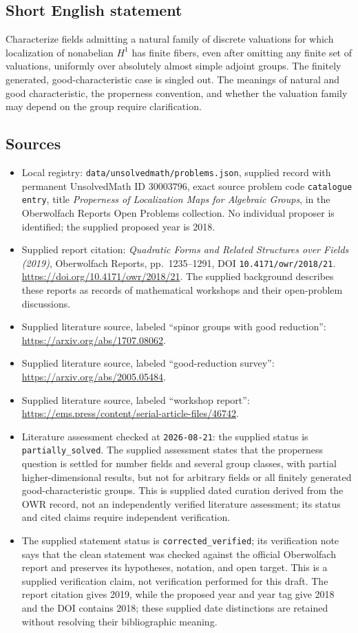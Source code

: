 \documentclass[11pt]{article}
\begin{document}
\subsection{Short English statement}
Characterize fields admitting a natural family of discrete valuations for which localization of nonabelian \(H^1\) has finite fibers, even after omitting any finite set of valuations, uniformly over absolutely almost simple adjoint groups. The finitely generated, good-characteristic case is singled out. The meanings of natural and good characteristic, the properness convention, and whether the valuation family may depend on the group require clarification.
\subsection{Sources}
\begin{itemize}
\item Local registry: \texttt{data/unsolvedmath/problems.json}, supplied record with permanent UnsolvedMath ID \(30003796\), exact source problem code \texttt{catalogue entry}, title \emph{Properness of Localization Maps for Algebraic Groups}, in the Oberwolfach Reports Open Problems collection. No individual proposer is identified; the supplied proposed year is 2018.
\item Supplied report citation: \emph{Quadratic Forms and Related Structures over Fields (2019)}, Oberwolfach Reports, pp.~1235--1291, DOI \texttt{10.4171/owr/2018/21}. \url{https://doi.org/10.4171/owr/2018/21}. The supplied background describes these reports as records of mathematical workshops and their open-problem discussions.
\item Supplied literature source, labeled ``spinor groups with good reduction'': \url{https://arxiv.org/abs/1707.08062}.
\item Supplied literature source, labeled ``good-reduction survey'': \url{https://arxiv.org/abs/2005.05484}.
\item Supplied literature source, labeled ``workshop report'': \url{https://ems.press/content/serial-article-files/46742}.
\item Literature assessment checked at \texttt{2026-08-21}: the supplied status is \texttt{partially\_solved}. The supplied assessment states that the properness question is settled for number fields and several group classes, with partial higher-dimensional results, but not for arbitrary fields or all finitely generated good-characteristic groups. This is supplied dated curation derived from the OWR record, not an independently verified literature assessment; its status and cited claims require independent verification.
\item The supplied statement status is \texttt{corrected\_verified}; its verification note says that the clean statement was checked against the official Oberwolfach report and preserves its hypotheses, notation, and open target. This is a supplied verification claim, not verification performed for this draft. The report citation gives 2019, while the proposed year and year tag give 2018 and the DOI contains 2018; these supplied date distinctions are retained without resolving their bibliographic meaning.
\end{itemize}
\end{document}
